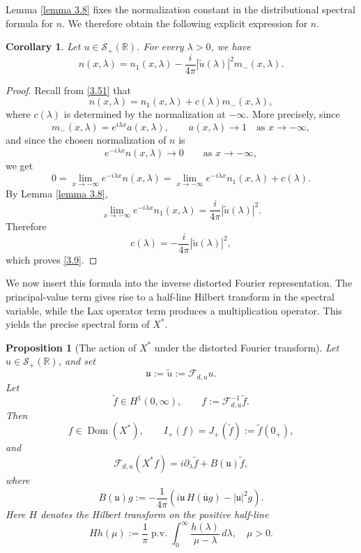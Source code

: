 \documentclass[10pt]{article}
\newtheorem{proposition}[theorem]{Proposition}
\newtheorem{corollary}[theorem]{Corollary}
\numberwithin{equation}{section}
\numberwithin{theorem}{section}
\begin{document}
\noindent
Lemma \ref{lemma 3.8} fixes the normalization constant in the distributional spectral
formula for \(n\). We therefore obtain the following explicit expression for
\(n\).

\begin{corollary}
\label{corollary 2.13}
Let \(u\in\mathcal S_+(\mathbb R)\). For every \(\lambda>0\), we have
\begin{equation}
\label{3.9}
n(x,\lambda)
=
n_1(x,\lambda)
-
\frac{i}{4\pi}|\widetilde u(\lambda)|^2m_-(x,\lambda).
\end{equation}
\end{corollary}

\begin{proof}
Recall from \eqref{3.51} that
\[
n(x,\lambda)=n_1(x,\lambda)+c(\lambda)m_-(x,\lambda),
\]
where \(c(\lambda)\) is determined by the normalization at \(-\infty\). More precisely,
since
\[
m_-(x,\lambda)=e^{i\lambda x}a(x,\lambda),
\qquad
a(x,\lambda)\to1
\quad\text{as }x\to-\infty,
\]
and since the chosen normalization of \(n\) is
\[
e^{-i\lambda x}n(x,\lambda)\to0
\qquad\text{as }x\to-\infty,
\]
we get
\[
0
=
\lim_{x\to-\infty}e^{-i\lambda x}n(x,\lambda)
=
\lim_{x\to-\infty}e^{-i\lambda x}n_1(x,\lambda)+c(\lambda).
\]
By Lemma \ref{lemma 3.8},
\[
\lim_{x\to-\infty}e^{-i\lambda x}n_1(x,\lambda)
=
\frac{i}{4\pi}|\widetilde u(\lambda)|^2.
\]
Therefore
\[
c(\lambda)
=
-\frac{i}{4\pi}|\widetilde u(\lambda)|^2,
\]
which proves \eqref{3.9}.
\end{proof}
We now insert this formula into the inverse distorted Fourier representation. The
principal-value term gives rise to a half-line Hilbert transform in the spectral variable,
while the Lax operator term produces a multiplication operator. This yields the precise
spectral form of \(X^*\).
\begin{proposition}[The action of \(X^*\) under the distorted Fourier transform]
\label{prop:Xstar_under_Fd}
Let \(u\in\mathcal S_+(\mathbb R)\), and set
\[
\mathfrak u:=\widetilde u:=\mathcal F_{d,u}u.
\]
Let
\[
\widetilde f\in H^1(0,\infty),
\qquad
f:=\mathcal F_{d,u}^{-1}\widetilde f.
\]
Then
\[
f\in\operatorname{Dom}(X^*),
\qquad
I_+(f)=J_+(\widetilde f):=\widetilde f(0_{+}),
\]
and
\[
\mathcal F_{d,u}(X^*f)
=
i\partial_\lambda\widetilde f
+
B(\mathfrak u)\widetilde f,
\]
where
\[
B(\mathfrak u)g
:=
-\frac1{4\pi}
\left(
i\mathfrak u\,H(\overline{\mathfrak u}g)
-
|\mathfrak u|^2g
\right).
\]
Here \(H\) denotes the Hilbert transform on the positive half-line
\[
H h(\mu)
:=
\frac1\pi\operatorname{p.v.}
\int_0^\infty\frac{h(\lambda)}{\mu-\lambda}\,d\lambda,\quad \mu >0.
\]
\end{proposition}
\end{document}
